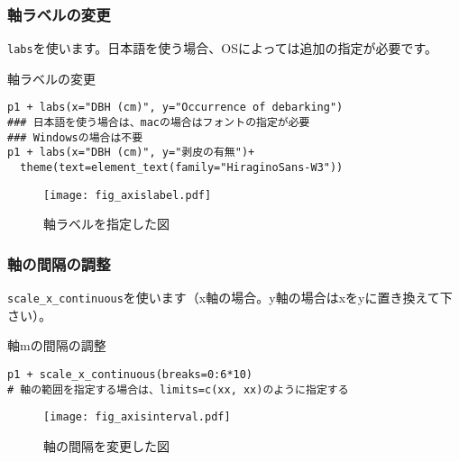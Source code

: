     \subsubsection{軸ラベルの変更}
\verb|labs|を使います。日本語を使う場合、OSによっては追加の指定が必要です。
\begin{itembox}[l]{軸ラベルの変更}
\begin{verbatim}
p1 + labs(x="DBH (cm)", y="Occurrence of debarking")
### 日本語を使う場合は、macの場合はフォントの指定が必要
### Windowsの場合は不要
p1 + labs(x="DBH (cm)", y="剥皮の有無")+
  theme(text=element_text(family="HiraginoSans-W3"))
\end{verbatim}
\end{itembox}
\begin{figure}[htb]
\begin{center}
\graphicspath{{1_basic/figs/}}
\texttt{[image: fig\_axislabel.pdf]}\\
\caption{軸ラベルを指定した図}
 \label{axislabel}
\end{center}
\end{figure}

    \subsubsection{軸の間隔の調整}
\verb|scale_x_continuous|を使います（x軸の場合。y軸の場合はxをyに置き換えて下さい）。
\begin{itembox}[l]{軸mの間隔の調整}
\begin{verbatim}
p1 + scale_x_continuous(breaks=0:6*10)
# 軸の範囲を指定する場合は、limits=c(xx, xx)のように指定する
\end{verbatim}
\end{itembox}
\begin{figure}[htb]
\begin{center}
\graphicspath{{1_basic/figs/}}
\texttt{[image: fig\_axisinterval.pdf]}\\
\caption{軸の間隔を変更した図}
 \label{axisint}
\end{center}
\end{figure}

